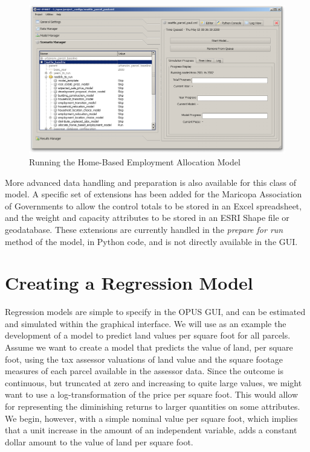 \begin{figure}[htp]
\begin{center}
\includegraphics[scale=0.35]{graphics/create-allocation-model-run.png}
\end{center}
\caption{Running the Home-Based Employment Allocation Model}
\label{fig:model-allocation-3}
\end{figure}

More advanced data handling and preparation is also available for this class of model.  A specific set of extensions has been added for the Maricopa Association of Governments to allow the control totals to be stored in an Excel spreadsheet, and the weight and capacity attributes to be stored in an ESRI Shape file or geodatabase.  These extensions are currently handled in the \emph{prepare for run} method of the model, in Python code, and is not directly available in the GUI.

\section{Creating a Regression Model}

Regression models are simple to specify in the OPUS GUI, and can be estimated and simulated within the graphical interface.  We will use as an example the development of a model to predict land values per square foot for all parcels.  Assume we want to create a model that predicts the value of land, per square foot, using the tax assessor valuations of land value and the square footage measures of each parcel available in the assessor data.  Since the outcome is continuous, but truncated at zero and increasing to quite large values, we might want to use a log-transformation of the price per square foot.  This would allow for representing the diminishing returns to larger quantities on some attributes.  We begin, however, with a simple nominal value per square foot, which implies that a unit increase in the amount of an independent variable, adds a constant dollar amount to the value of land per square foot.

